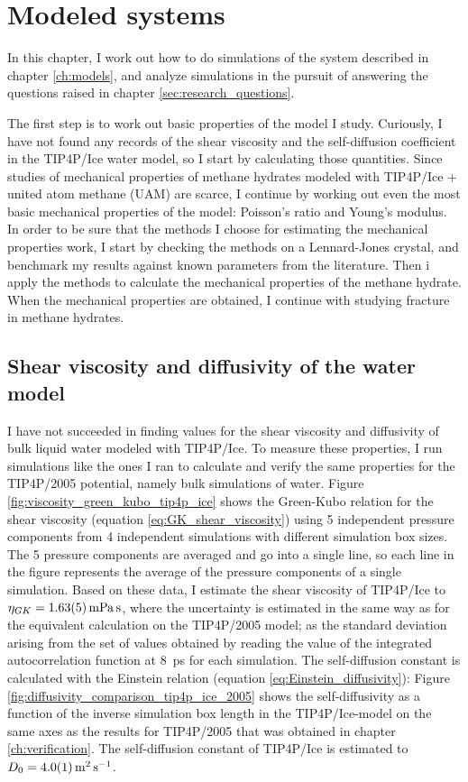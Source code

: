 
\chapter{Modeled systems}
\label{ch:modeledsystems}
In this chapter, I work out how to do simulations of the system described in chapter \ref{ch:models}, and analyze simulations in the pursuit of answering the questions raised in chapter \ref{sec:research_questions}.

The first step is to work out basic properties of the model I study. Curiously, I have not found any records of the shear viscosity and the self-diffusion coefficient in the TIP4P/Ice water model, so I start by calculating those quantities. Since studies of mechanical properties of methane hydrates modeled with TIP4P/Ice + united atom methane (UAM) are scarce, I continue by working out even the most basic mechanical properties of the model: Poisson's ratio and Young's modulus. In order to be sure that the methods I choose for estimating the mechanical properties work, I start by checking the methods on a Lennard-Jones crystal, and benchmark my results against known parameters from the literature. Then i apply the methods to calculate the mechanical properties of the methane hydrate. When the mechanical properties are obtained, I continue with studying fracture in methane hydrates.

\section{Shear viscosity and diffusivity of the water model}
I have not succeeded in finding values for the shear viscosity and diffusivity of bulk liquid water modeled with TIP4P/Ice. To measure these properties, I run simulations like the ones I ran to calculate and verify the same properties for the TIP4P/2005 potential, namely bulk simulations of water. Figure \ref{fig:viscosity_green_kubo_tip4p_ice} shows the Green-Kubo relation for the shear viscosity (equation \ref{eq:GK_shear_viscosity}) using 5 independent pressure components from 4 independent simulations with different simulation box sizes. The 5 pressure components are averaged and go into a single line, so each line in the figure represents the average of the pressure components of a single simulation. Based on these data, I estimate the shear viscosity of TIP4P/Ice to $\eta_{GK} = \text{\SI{1.63\pm 0.05}{\milli\pascal\second}}$, where the uncertainty is estimated in the same way as for the equivalent calculation on the TIP4P/2005 model; as the standard deviation arising from the set of values obtained by reading the value of the integrated autocorrelation function at \SI{8}{\pico\second} for each simulation. The self-diffusion constant is calculated with the Einstein relation (equation \ref{eq:Einstein_diffusivity}): Figure \ref{fig:diffusivity_comparison_tip4p_ice_2005} shows the self-diffusivity as a function of the inverse simulation box length in the TIP4P/Ice-model on the same axes as the results for TIP4P/2005 that was obtained in chapter \ref{ch:verification}. The self-diffusion constant of TIP4P/Ice is estimated to $D_0 = \SI{4.0 \pm 0.1}{\meter\squared\per\second}$.

